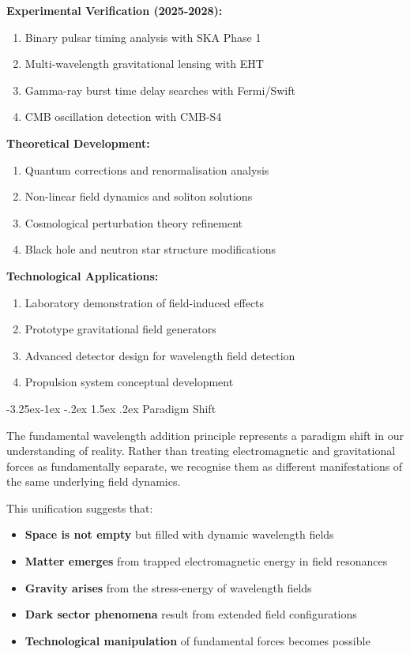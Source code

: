 \documentclass[10pt,twocolumn]{article}
\makeatletter
\renewcommand\subsection{\@startsection{subsection}{2}{\z@}%
  {-3.25ex\@plus -1ex \@minus -.2ex}%
  {1.5ex \@plus .2ex}%
  {\normalfont\normalsize\bfseries}}
\makeatother
\begin{document}
\textbf{Experimental Verification (2025-2028):}
\begin{enumerate}
\item Binary pulsar timing analysis with SKA Phase 1
\item Multi-wavelength gravitational lensing with EHT
\item Gamma-ray burst time delay searches with Fermi/Swift
\item CMB oscillation detection with CMB-S4
\end{enumerate}

\textbf{Theoretical Development:}
\begin{enumerate}
\item Quantum corrections and renormalisation analysis
\item Non-linear field dynamics and soliton solutions
\item Cosmological perturbation theory refinement
\item Black hole and neutron star structure modifications
\end{enumerate}

\textbf{Technological Applications:}
\begin{enumerate}
\item Laboratory demonstration of field-induced effects
\item Prototype gravitational field generators
\item Advanced detector design for wavelength field detection
\item Propulsion system conceptual development
\end{enumerate}

\subsection{Paradigm Shift}

The fundamental wavelength addition principle represents a paradigm shift in our understanding of reality. Rather than treating electromagnetic and gravitational forces as fundamentally separate, we recognise them as different manifestations of the same underlying field dynamics.

This unification suggests that:
\begin{itemize}
\item \textbf{Space is not empty} but filled with dynamic wavelength fields
\item \textbf{Matter emerges} from trapped electromagnetic energy in field resonances
\item \textbf{Gravity arises} from the stress-energy of wavelength fields
\item \textbf{Dark sector phenomena} result from extended field configurations
\item \textbf{Technological manipulation} of fundamental forces becomes possible
\end{itemize}
\end{document}
